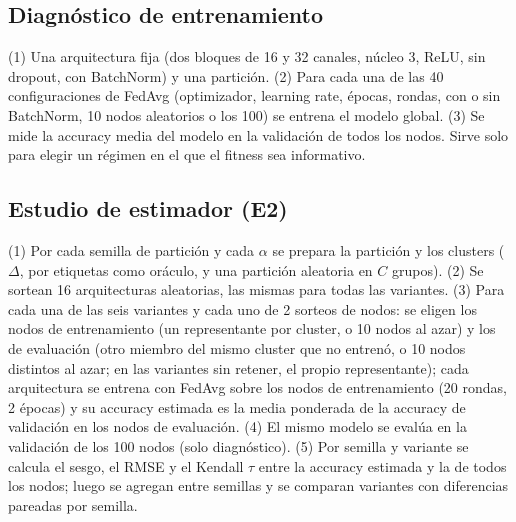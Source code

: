 \documentclass[11pt,a4paper]{article}
\begin{document}
\subsection*{Diagnóstico de entrenamiento}
(1) Una arquitectura fija (dos bloques de 16 y 32 canales, núcleo 3, ReLU, sin dropout, con BatchNorm) y una partición. (2) Para cada una de las 40 configuraciones de FedAvg (optimizador, learning rate, épocas, rondas, con o sin BatchNorm, 10 nodos aleatorios o los 100) se entrena el modelo global. (3) Se mide la accuracy media del modelo en la validación de todos los nodos. Sirve solo para elegir un régimen en el que el fitness sea informativo.

\subsection*{Estudio de estimador (E2)}
(1) Por cada semilla de partición y cada $\alpha$ se prepara la partición y los clusters ($\Delta$, por etiquetas como oráculo, y una partición aleatoria en $C$ grupos). (2) Se sortean 16 arquitecturas aleatorias, las mismas para todas las variantes. (3) Para cada una de las seis variantes y cada uno de 2 sorteos de nodos: se eligen los nodos de entrenamiento (un representante por cluster, o 10 nodos al azar) y los de evaluación (otro miembro del mismo cluster que no entrenó, o 10 nodos distintos al azar; en las variantes sin retener, el propio representante); cada arquitectura se entrena con FedAvg sobre los nodos de entrenamiento (20 rondas, 2 épocas) y su accuracy estimada es la media ponderada de la accuracy de validación en los nodos de evaluación. (4) El mismo modelo se evalúa en la validación de los 100 nodos (solo diagnóstico). (5) Por semilla y variante se calcula el sesgo, el RMSE y el Kendall $\tau$ entre la accuracy estimada y la de todos los nodos; luego se agregan entre semillas y se comparan variantes con diferencias pareadas por semilla.
\end{document}
